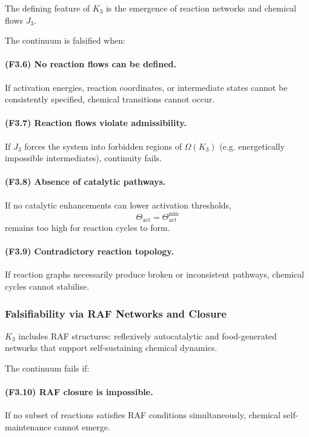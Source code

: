 The defining feature of $K_3$ is the emergence of reaction networks and
chemical flows $J_3$.

The continuum is falsified when:

\paragraph{(F3.6) No reaction flows can be defined.}
If activation energies, reaction coordinates, or intermediate states
cannot be consistently specified, chemical transitions cannot occur.

\paragraph{(F3.7) Reaction flows violate admissibility.}
If $J_3$ forces the system into forbidden regions of $\Omega(K_3)$ (e.g.
energetically impossible intermediates), continuity fails.

\paragraph{(F3.8) Absence of catalytic pathways.}
If no catalytic enhancements can lower activation thresholds,
\[
\Theta_{\mathrm{act}} = \Theta_{\mathrm{act}}^{\mathrm{min}}
\]
remains too high for reaction cycles to form.

\paragraph{(F3.9) Contradictory reaction topology.}
If reaction graphs necessarily produce broken or inconsistent pathways,
chemical cycles cannot stabilise.



\subsubsection{Falsifiability via RAF Networks and Closure}

$K_3$ includes RAF structures: reflexively autocatalytic and
food-generated networks that support self-sustaining chemical dynamics.

The continuum fails if:

\paragraph{(F3.10) RAF closure is impossible.}
If no subset of reactions satisfies RAF conditions simultaneously,
chemical self-maintenance cannot emerge.

